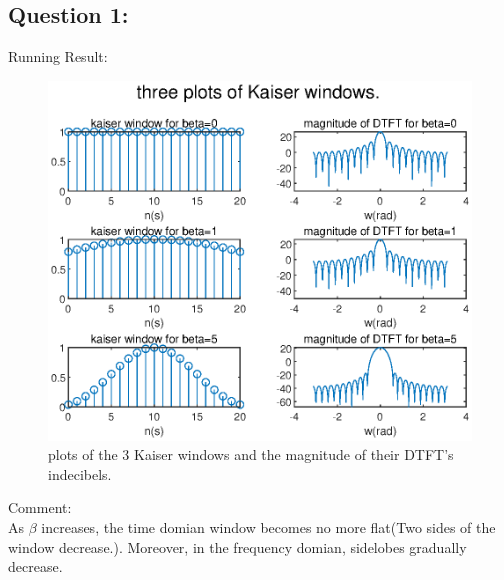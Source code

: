 \documentclass[onecolumn,oneside]{SUSTechHomework}
\begin{document}
\subsection*{Question 1:}
Running Result:
\begin{figure}[H]
	\centering
	\includegraphics[width=170mm]{pictures/win1.eps}
	\caption{plots of the 3 Kaiser windows and the magnitude of their DTFT's indecibels.}
\end{figure}
Comment:\\
As $\beta$ increases, the time domian window becomes no more flat(Two sides of the window decrease.).
Moreover, in the frequency domian, sidelobes gradually decrease.
\end{document}
